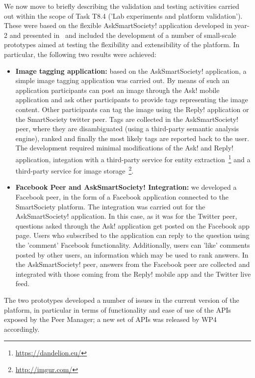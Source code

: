 We now move to briefly describing the validation and testing activities carried out within the scope of Task T8.4 ('Lab experiments and platform validation'). These were based on the flexible AskSmartSociety! application developed in year-2 and presented in~\cite{D8.2} and included the development of a number of small-scale prototypes aimed at testing the flexibility and extensibility of the platform. In particular, the following two results were achieved:
\begin{itemize}
\item {\bfseries Image tagging application:} based on the AskSmartSociety! application, a simple image tagging application was carried out. By means of such an application participants can post an image through the Ask! mobile application and ask other participants to provide tags representing the image content. Other participants can tag the image using the Reply! application or the SmartSociety twitter peer. Tags are collected in the AskSmartSociety! peer, where they are disambiguated (using a third-party semantic analysis engine), ranked and finally the most likely tags are reported back to the user. The development required minimal modifications of the Ask! and Reply! application, integation with a third-party service for entity extraction~\footnote{\url{https://dandelion.eu/}} and a third-party service for image storage~\footnote{\url{http://imgur.com/}}.
\item {\bfseries Facebook Peer and AskSmartSociety! Integration:} we developed a Facebook peer, in the form of a Facebook application connected to the SmartSociety platform. The integration was carried out for the AskSmartSociety! application. In this case, as it was for the Twitter peer, questions asked through the Ask! application get posted on the Facebook app page. Users who subscribed to the application can reply to the question using the 'comment' Facebook functionality. Additionally, users can 'like' comments posted by other users, an information which may be used to rank answers. In the AskSmartSociety! peer, answers from the Facebook peer are collected and integrated with those coming from the Reply! mobile app and the Twitter live feed. 
\end{itemize}
The two prototypes developed a number of issues in the current version of the platform, in particular in terms of functionality and ease of use of the APIs exposed by the Peer Manager; a new set of APIs was released by WP4 accordingly.